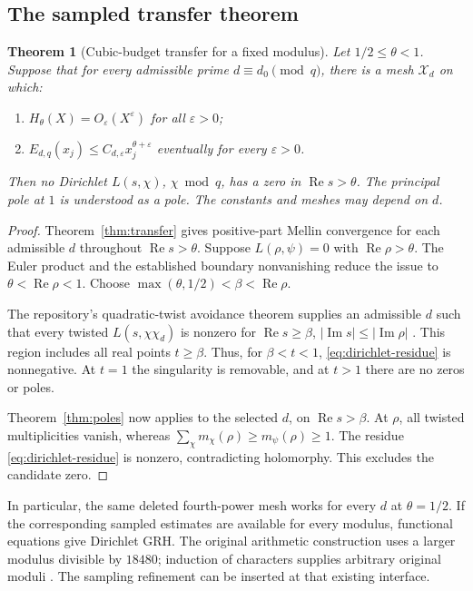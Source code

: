 \documentclass[11pt]{article}
\newtheorem{theorem}{Theorem}[section]
\theoremstyle{definition}
\newcommand{\ep}{\varepsilon}
\newcommand{\Rea}{\operatorname{Re}}
\newcommand{\Ima}{\operatorname{Im}}
\newcommand{\mesh}{\mathcal X}
\begin{document}
\subsection{The sampled transfer theorem}

\begin{theorem}[Cubic-budget transfer for a fixed modulus]\label{thm:dirichlet}
Let \(1/2\leq\theta<1\). Suppose that for every admissible prime
\(d\equiv d_0\pmod q\), there is a mesh \(\mesh_d\) on which:
\begin{enumerate}
\item \(H_\theta(X)=O_\ep(X^\ep)\) for all \(\ep>0\);
\item \(E_{d,q}(x_j)\leq C_{d,\ep}x_j^{\theta+\ep}\) eventually
for every \(\ep>0\).
\end{enumerate}
Then no Dirichlet \(L(s,\chi)\), \(\chi\bmod q\), has a zero in
\(\Rea s>\theta\). The principal pole at \(1\) is understood as a pole.
The constants and meshes may depend on \(d\).
\end{theorem}
\begin{proof}
Theorem~\ref{thm:transfer} gives positive-part Mellin convergence for
each admissible \(d\) throughout \(\Rea s>\theta\).
Suppose \(L(\rho,\psi)=0\) with \(\Rea\rho>\theta\).
The Euler product and the established boundary nonvanishing reduce the
issue to \(\theta<\Rea\rho<1\). Choose
\(\max(\theta,1/2)<\beta<\Rea\rho\).

The repository's quadratic-twist avoidance theorem supplies an
admissible \(d\) such that every twisted \(L(s,\chi\chi_d)\) is
nonzero for
\(\Rea s\geq\beta\), \(|\Ima s|\leq|\Ima\rho|\)
\cite{twist,criterion}. This region includes all real points
\(t\geq\beta\). Thus, for \(\beta<t<1\),
\eqref{eq:dirichlet-residue} is nonnegative. At \(t=1\) the
singularity is removable, and at \(t>1\) there are no zeros or poles.

Theorem~\ref{thm:poles} now applies to the selected \(d\), on
\(\Rea s>\beta\). At \(\rho\), all twisted multiplicities vanish,
whereas \(\sum_\chi m_\chi(\rho)\geq m_\psi(\rho)\geq1\).
The residue \eqref{eq:dirichlet-residue} is nonzero, contradicting
holomorphy. This excludes the candidate zero.
\end{proof}

In particular, the same deleted fourth-power mesh works for every
\(d\) at \(\theta=1/2\). If the corresponding sampled estimates are
available for every modulus, functional equations give Dirichlet GRH.
The original arithmetic construction uses a larger modulus divisible by
\(18480\); induction of characters supplies arbitrary original moduli
\cite{onesided}. The sampling refinement can be inserted at that
existing interface.
\end{document}
